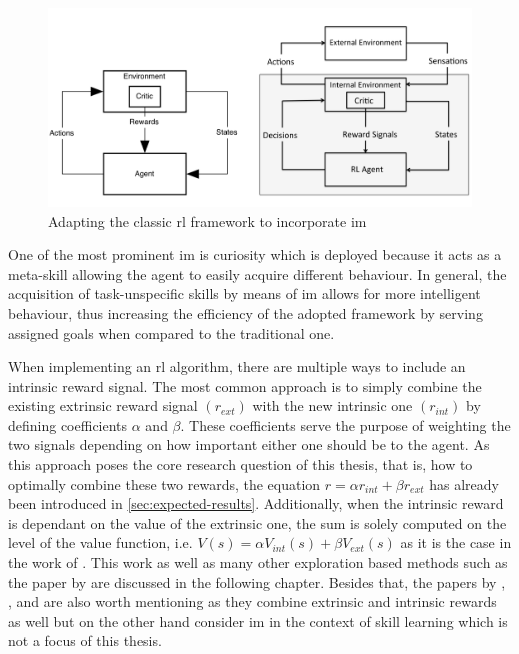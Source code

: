 \documentclass[draft,final]{vutinfth} %
\newcommand{\p}[1]{see p. #1}
\begin{document}
    \begin{figure}[h]
        \centering
        \includegraphics[width=\textwidth]{figures/adapted_rl_framework.png}
        \caption[Adapting the classic \acrlong{rl} framework to incorporate \acrlong{im}]{Adapting the classic \gls{rl} framework to incorporate \gls{im}\protect\footnotemark[4]}
        \label{fig:adapted_rl_framework}
    \end{figure}

    \footnotetext[4]{\citep[\p{2}]{singh_intrinsically_2010}}

    One of the most prominent \gls{im} is curiosity which is deployed because it acts as a meta-skill allowing the agent to easily acquire different behaviour.
    In general, the acquisition of task-unspecific skills by means of \gls{im} allows for more intelligent behaviour, thus increasing the efficiency of the adopted framework by serving assigned goals when compared to the traditional one.

    When implementing an \gls{rl} algorithm, there are multiple ways to include an intrinsic reward signal.
    The most common approach is to simply combine the existing extrinsic reward signal $(r_{ext})$ with the new intrinsic one $(r_{int})$ by defining coefficients $\alpha$ and $\beta$.
    These coefficients serve the purpose of weighting the two signals depending on how important either one should be to the agent.
    As this approach poses the core research question of this thesis, that is, how to optimally combine these two rewards, the equation $r = \alpha r_{int} + \beta r_{ext}$ has already been introduced in \autoref{sec:expected-results}.
    Additionally, when the intrinsic reward is dependant on the value of the extrinsic one, the sum is solely computed on the level of the value function, i.e. $V(s)=\alpha V_{int}(s) + \beta V_{ext}(s)$ as it is the case in the work of \citet{kim_curiosity-bottleneck_2019-1}.
    This work as well as many other exploration based methods such as the paper by \citet{burda_exploration_2018} are discussed in the following chapter.
    Besides that, the papers by \citeauthor{gregor_variational_2016}, \citeauthor{vezhnevets_feudal_2017}, and \citeauthor{huang_learning_2019} are also worth mentioning as they combine extrinsic and intrinsic rewards as well but on the other hand consider \gls{im} in the context of skill learning which is not a focus of this thesis.
\end{document}
